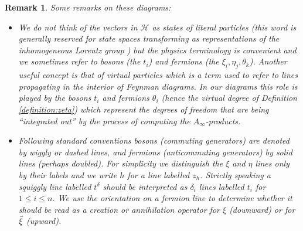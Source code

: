 \documentclass[english,letter paper,12pt,leqno]{article}
\theoremstyle{example}
\newtheorem{remark}[theorem]{Remark}
\numberwithin{equation}{section}
\def\BB{\mathcal{B}}
\def\HH{\HH}
\def\HH{\mathcal{H}}
\def\Ker{\operatorname{Ker}}
\begin{document}
\begin{remark} Some remarks on these diagrams:
\begin{itemize} 

\item We do not think of the vectors in $\HH$ as states of literal particles (this word is generally reserved for state spaces transforming as representations of the inhomogeneous Lorentz group \cite{weinberg}) but the physics terminology is convenient and we sometimes refer to \emph{bosons} (the $t_i$) and \emph{fermions} (the $\xi_i, \eta_j, \theta_k$). Another useful concept is that of \emph{virtual particles} which is a term used to refer to lines propagating in the interior of Feynman diagrams. In our diagrams this role is played by the bosons $t_i$ and fermions $\theta_i$ (hence the virtual degree of Definition \ref{definition:zeta}) which represent the degrees of freedom that are being ``integrated out'' by the process of computing the $A_\infty$-products. %

 
\item Following standard conventions bosons (commuting generators) are denoted by wiggly or dashed lines, and fermions (anticommuting generators) by solid lines \cite[\S 4.7]{ps} (perhaps doubled). For simplicity we distinguish the $\xi$ and $\eta$ lines only by their labels and we write $h$ for a line labelled $z_h$. Strictly speaking a squiggly line labelled $t^\delta$ should be interpreted as $\delta_i$ lines labelled $t_i$ for $1 \le i \le n$. We use the orientation on a fermion line to determine whether it should be read as a creation or annihilation operator for $\xi$ (downward) or for $\Bar{\xi}$ (upward).


\end{itemize}
\end{remark}
\end{document}
